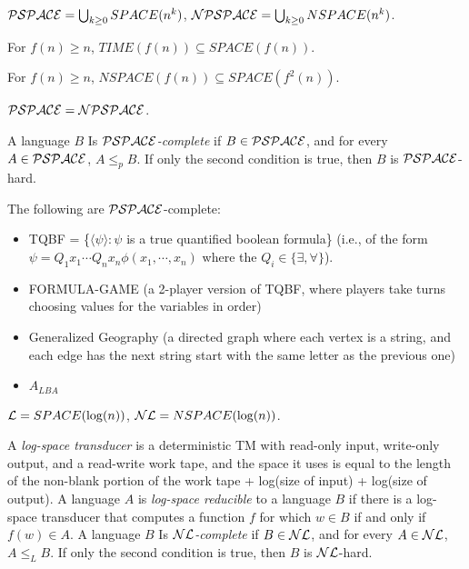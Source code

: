 \begin{definition}
$\mathcal{PSPACE} = \bigcup_{k \ge 0} SPACE(n^k)$, $\mathcal{NPSPACE} = \bigcup_{k \ge 0} NSPACE(n^k)$.
\end{definition}

\begin{theorem}
For $f(n) \ge n$, $TIME(f(n)) \subseteq SPACE(f(n))$.
\end{theorem}

\begin{theorem}
For $f(n) \ge n$, $NSPACE(f(n)) \subseteq SPACE(f^2(n))$.
\end{theorem}

\begin{corollary}
$\mathcal{PSPACE} = \mathcal{NPSPACE}$.
\end{corollary}

\begin{definition}
A language $B$ Is \emph{$\mathcal{PSPACE}$-complete} if $B \in \mathcal{PSPACE}$, and for every $A \in \mathcal{PSPACE}$, $A \le_p B$. If only the second condition is true, then $B$ is $\mathcal{PSPACE}$-hard.
\end{definition}

\begin{theorem}
The following are $\mathcal{PSPACE}$-complete:
\begin{itemize}
\item TQBF = \{$\langle\psi\rangle : \psi$ is a true quantified boolean formula\} (i.e., of the form $\psi = Q_1x_1\cdots Q_nx_n\phi(x_1,\cdots,x_n)$ where the $Q_i \in \{\exists, \forall\}$).
\item FORMULA-GAME (a 2-player version of TQBF, where players take turns choosing values for the variables in order)
\item Generalized Geography (a directed graph where each vertex is a string, and each edge has the next string start with the same letter as the previous one)
\item $A_{LBA}$
\end{itemize}
\end{theorem}

\begin{definition}
$\mathcal{L} = SPACE(\log(n))$, $\mathcal{NL} = NSPACE(\log(n))$.
\end{definition}

\begin{definition}
A \emph{log-space transducer} is a deterministic TM with read-only input, write-only output, and a read-write work tape, and the space it uses is equal to the length of the non-blank portion of the work tape + log(size of input) + log(size of output). A language $A$ is \emph{log-space reducible} to a language $B$ if there is a log-space transducer that computes a function $f$ for which $w \in B$ if and only if $f(w) \in A$. A language $B$ Is \emph{$\mathcal{NL}$-complete} if $B \in \mathcal{NL}$, and for every $A \in \mathcal{NL}$, $A \le_L B$. If only the second condition is true, then $B$ is $\mathcal{NL}$-hard.
\end{definition}

